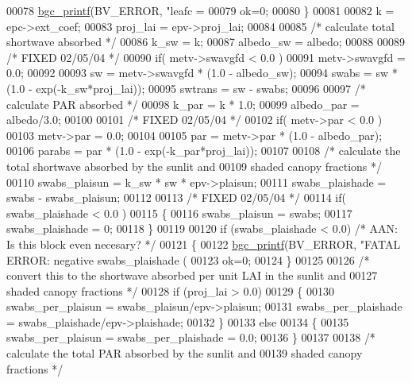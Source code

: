 \begin{DoxyCode}
{00078         \hyperlink{bgc__io_8c_af287cce6e2aede1ce337de9319e80d0d}{bgc\_printf}(BV\_ERROR, \textcolor{stringliteral}{"leafc = %
00079         ok=0;
00080     \}
00081     
00082     k = epc->ext\_coef;
00083     proj\_lai = epv->proj\_lai;
00084     
00085     \textcolor{comment}{/* calculate total shortwave absorbed */}
00086     k\_sw = k;
00087     albedo\_sw = albedo;
00088 
00089     \textcolor{comment}{/* FIXED 02/05/04 */}
00090     \textcolor{keywordflow}{if}( metv->swavgfd < 0.0 )
00091         metv->swavgfd = 0.0;
00092 
00093     sw = metv->swavgfd * (1.0 - albedo\_sw);
00094     swabs = sw * (1.0 - exp(-k\_sw*proj\_lai));
00095     swtrans = sw - swabs;
00096     
00097     \textcolor{comment}{/* calculate PAR absorbed */}
00098     k\_par = k * 1.0;
00099     albedo\_par = albedo/3.0;
00100 
00101     \textcolor{comment}{/* FIXED 02/05/04 */}
00102     \textcolor{keywordflow}{if}( metv->par < 0.0 )
00103         metv->par = 0.0;
00104 
00105     par = metv->par * (1.0 - albedo\_par);
00106     parabs = par * (1.0 - exp(-k\_par*proj\_lai));
00107     
00108     \textcolor{comment}{/* calculate the total shortwave absorbed by the sunlit and}
00109 \textcolor{comment}{    shaded canopy fractions */}
00110     swabs\_plaisun = k\_sw * sw * epv->plaisun;
00111     swabs\_plaishade = swabs - swabs\_plaisun;
00112 
00113     \textcolor{comment}{/* FIXED 02/05/04 */}
00114     \textcolor{keywordflow}{if}( swabs\_plaishade  < 0.0 )
00115     \{
00116         swabs\_plaisun = swabs;
00117         swabs\_plaishade  = 0;
00118     \}
00119     
00120     \textcolor{keywordflow}{if} (swabs\_plaishade < 0.0) \textcolor{comment}{/* AAN: Is this block even necesary? */}
00121     \{
00122         \hyperlink{bgc__io_8c_af287cce6e2aede1ce337de9319e80d0d}{bgc\_printf}(BV\_ERROR, \textcolor{stringliteral}{"FATAL ERROR: negative swabs\_plaishade (%
00123         ok=0;
00124     \}
00125 
00126     \textcolor{comment}{/* convert this to the shortwave absorbed per unit LAI in the sunlit and }
00127 \textcolor{comment}{    shaded canopy fractions */}
00128     \textcolor{keywordflow}{if} (proj\_lai > 0.0)
00129     \{
00130         swabs\_per\_plaisun = swabs\_plaisun/epv->plaisun;
00131         swabs\_per\_plaishade = swabs\_plaishade/epv->plaishade;
00132     \}
00133     \textcolor{keywordflow}{else}
00134     \{
00135         swabs\_per\_plaisun = swabs\_per\_plaishade = 0.0;
00136     \}
00137 
00138     \textcolor{comment}{/* calculate the total PAR absorbed by the sunlit and}
00139 \textcolor{comment}{    shaded canopy fractions */}
}}}
\end{DoxyCode}
